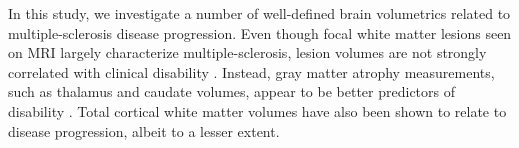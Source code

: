 In this study, we investigate a number of well-defined brain volumetrics related to multiple-sclerosis disease progression. Even though focal white matter lesions seen on MRI largely characterize multiple-sclerosis, lesion volumes are not strongly correlated with clinical disability \cite{lesions1,lesions2,lesions3}. Instead, gray matter atrophy measurements, such as thalamus \cite{thal1,thal2,thal3,thal4} and caudate \cite{caud1,caud2} volumes, appear to be better predictors of disability \cite{gm1,gm2,gm3,gm4}. Total cortical white matter volumes \cite{white1} have also been shown to relate to disease progression, albeit to a lesser extent. %